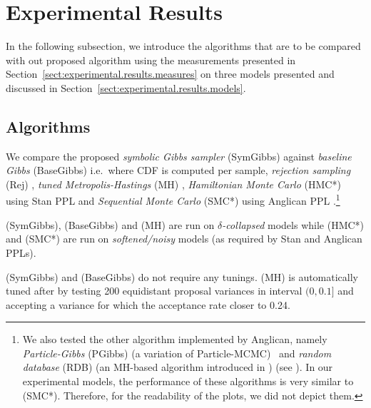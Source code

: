 \documentclass[]{article}
\begin{document}
\section{Experimental Results}
\label{sect:experimental.results}
In the following subsection, we introduce the algorithms that are to be compared 
with out proposed algorithm using the measurements presented in Section~\ref{sect:experimental.results.measures}
on three models presented and discussed in Section~\ref{sect:experimental.results.models}. 


\subsection{Algorithms} 
\label{sect:experimental.results.algorithms}
We compare the proposed \emph{symbolic Gibbs sampler} (SymGibbs) against
\emph{baseline Gibbs} (BaseGibbs) \citep{pearl1987evidential}
i.e.\ where CDF is computed per sample, 
\emph{rejection sampling} (Rej) \citep{hammersley1964monte}, 
\emph{tuned Metropolis-Hastings} (MH) \citep{roberts1997weak}, 
\emph{Hamiltonian Monte Carlo} (HMC*) using Stan PPL \citep{stan-manual:2014}
and \emph{Sequential Monte Carlo} (SMC*) \citep{del2006sequential} using Anglican PPL \citep{wood2014new}.\footnote{
We also tested the other algorithm implemented by Anglican, namely 
\emph{Particle-Gibbs} (PGibbs) (a variation of Particle-MCMC\citep{andrieu2010particle}) \
and \emph{random database} (RDB) (an MH-based algorithm introduced in \citep{wingate2011lightweight}) (see \cite{wood2014new}).
In our experimental models, the performance of these algorithms is very similar to (SMC*).
Therefore, for the readability of the plots, we did not depict them.
}

(SymGibbs), (BaseGibbs) and (MH) are run on \emph{$\delta$-collapsed} models while (HMC*) and (SMC*) are run on \emph{softened/noisy} models (as required by Stan and Anglican PPLs).

(SymGibbs) and (BaseGibbs) do not require any tunings. 
(MH) is automatically tuned after \citep{roberts1997weak} by testing 200 equidistant proposal variances in interval 
$(0, 0.1]$ and accepting a variance for which the acceptance rate closer to 0.24.
\end{document}
